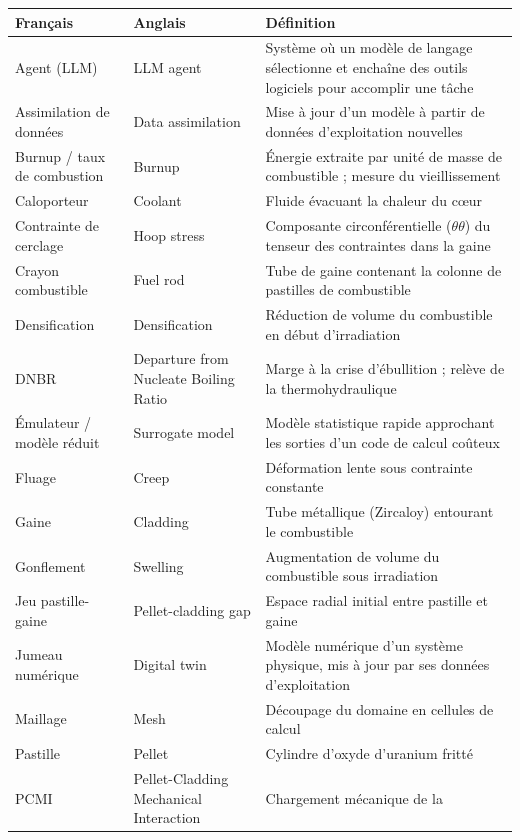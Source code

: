 \documentclass[12pt,a4paper,french]{report}
\begin{document}
\noindent
\begin{xltabular}{\textwidth}{@{}>{\raggedright\arraybackslash}p{2.6cm}
                     >{\raggedright\arraybackslash}p{4.4cm}
                     >{\raggedright\arraybackslash}X@{}}
\toprule
\textbf{Français} & \textbf{Anglais} & \textbf{Définition}\\
\midrule
\endhead
Agent (LLM) & LLM agent & Système où un modèle de langage sélectionne et
  enchaîne des outils logiciels pour accomplir une tâche\\
Assimilation de données & Data assimilation & Mise à jour d'un modèle à partir
  de données d'exploitation nouvelles\\
Burnup / taux de combustion & Burnup & Énergie extraite par unité de masse de
  combustible ; mesure du vieillissement\\
Caloporteur & Coolant & Fluide évacuant la chaleur du c\oe ur\\
Contrainte de cerclage & Hoop stress & Composante circonférentielle
  ($\theta\theta$) du tenseur des contraintes dans la gaine\\
Crayon combustible & Fuel rod & Tube de gaine contenant la colonne de
  pastilles de combustible\\
Densification & Densification & Réduction de volume du combustible en début
  d'irradiation\\
DNBR & Departure from Nucleate Boiling Ratio & Marge à la crise d'ébullition ;
  relève de la thermohydraulique\\
Émulateur / modèle réduit & Surrogate model & Modèle statistique rapide
  approchant les sorties d'un code de calcul coûteux\\
Fluage & Creep & Déformation lente sous contrainte constante\\
Gaine & Cladding & Tube métallique (Zircaloy) entourant le combustible\\
Gonflement & Swelling & Augmentation de volume du combustible sous
  irradiation\\
Jeu pastille-gaine & Pellet-cladding gap & Espace radial initial entre pastille
  et gaine\\
Jumeau numérique & Digital twin & Modèle numérique d'un système physique,
  mis à jour par ses données d'exploitation\\
Maillage & Mesh & Découpage du domaine en cellules de calcul\\
Pastille & Pellet & Cylindre d'oxyde d'uranium fritté\\
PCMI & Pellet-Cladding Mechanical Interaction & Chargement mécanique de la

\end{xltabular}
\end{document}
